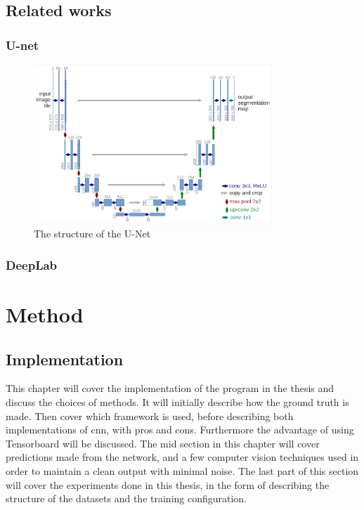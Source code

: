 \documentclass[USenglish]{ifimaster}  %
\begin{document}
\section{Related works}
\subsection{U-net}

\begin{figure}[H]
    \centering
    \includegraphics[width=0.8\textwidth]{bilder/u_net.png}
    \caption{The structure of the U-Net \cite{website:u_net}}
    \label{fig:u_net}
\end{figure}

\subsection{DeepLab}

\chapter{Method}
\section{Implementation}
This chapter will cover the implementation of the program in the thesis and discuss the choices of methods. It will initially describe how the ground truth is made. Then cover which framework is used, before describing both implementations of \ac{cnn}, with pros and cons. Furthermore the advantage of using Tensorboard will be discussed. The mid section in this chapter will cover predictions made from the network, and a few computer vision techniques used in order to maintain a clean output with minimal noise. The last part of this section will cover the experiments done in this thesis, in the form of describing the structure of the datasets and the training configuration.
\end{document}
